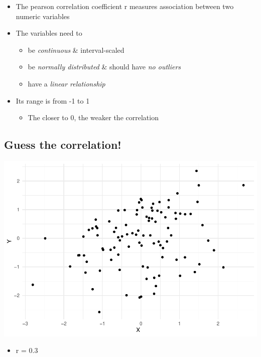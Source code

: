 \documentclass[
]{book}
\providecommand{\tightlist}{%
  \setlength{\itemsep}{0pt}\setlength{\parskip}{0pt}}
\begin{document}
\begin{itemize}
\tightlist
\item
  The pearson correlation coefficient r measures association between two numeric variables
\item
  The variables need to

  \begin{itemize}
  \tightlist
  \item
    be \emph{continuous} \& interval-scaled
  \item
    be \emph{normally distributed} \& should have \emph{no outliers}
  \item
    have a \emph{linear relationship}
  \end{itemize}
\item
  Its range is from -1 to 1

  \begin{itemize}
  \tightlist
  \item
    The closer to 0, the weaker the correlation
  \end{itemize}
\end{itemize}

\subsection{Guess the correlation!}\label{guess-the-correlation}

\includegraphics{_main_files/figure-latex/unnamed-chunk-75-1.pdf}

\begin{itemize}
\tightlist
\item
  r = 0.3
\end{itemize}
\end{document}
